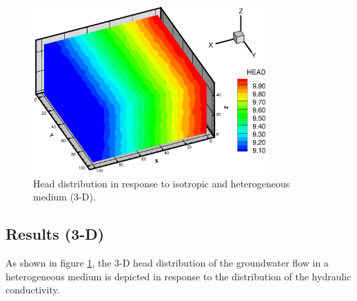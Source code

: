 \begin{figure}[htb]
\centering
\vspace{-40pt}
\includegraphics[width=0.8\textwidth]{Chapter5/figure/3DHGWR.eps}
\vspace{-20pt}
\caption{Head distribution in response to isotropic and heterogeneous medium (3-D).}
\vspace{-10pt}
\label{HeadDis3d}
\end{figure}

\subsection{Results (3-D) }

As shown in figure \ref{HeadDis3d}, the 3-D head distribution of the groundwater flow in a heterogeneous medium is depicted in response to the distribution of the hydraulic conductivity. 
